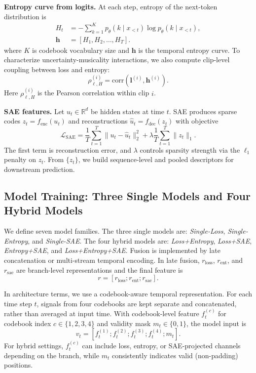 \documentclass{article}
\begin{document}
\textbf{Entropy curve from logits.}
At each step, entropy of the next-token distribution is
\begin{equation}
\begin{aligned}
H_t &= -\sum_{k=1}^{K}p_{\theta}(k\mid x_{<t})\log p_{\theta}(k\mid x_{<t}), \\
\mathbf{h} &= [H_1,H_2,\ldots,H_T].
\end{aligned}
\end{equation}
where $K$ is codebook vocabulary size
and $\mathbf{h}$ is the temporal entropy curve.
To characterize uncertainty-musicality interactions,
we also compute clip-level coupling between loss and entropy:
\begin{equation}
\rho_{\ell,H}^{(i)}=\mathrm{corr}(\mathbf{l}^{(i)},\mathbf{h}^{(i)}).
\end{equation}
Here $\rho_{\ell,H}^{(i)}$ is the Pearson correlation within clip $i$.

\textbf{SAE features.}
Let $u_t\in\mathbb{R}^{d}$ be hidden states at time $t$.
SAE produces sparse codes $z_t=f_{\mathrm{enc}}(u_t)$
and reconstructions $\hat{u}_t=f_{\mathrm{dec}}(z_t)$ with objective
\begin{equation}
\mathcal{L}_{\mathrm{SAE}}=
\frac{1}{T}\sum_{t=1}^{T}\|u_t-\hat{u}_t\|_2^2+
\lambda\frac{1}{T}\sum_{t=1}^{T}\|z_t\|_1.
\end{equation}
The first term is reconstruction error,
and $\lambda$ controls sparsity strength via the $\ell_1$ penalty on $z_t$.
From $\{z_t\}$, we build sequence-level and pooled descriptors for downstream prediction.

\subsection{Model Training: Three Single Models and Four Hybrid Models}

We define seven model families.
The three single models are:
\textit{Single-Loss}, \textit{Single-Entropy}, and \textit{Single-SAE}.
The four hybrid models are:
\textit{Loss+Entropy}, \textit{Loss+SAE}, \textit{Entropy+SAE}, and \textit{Loss+Entropy+SAE}.
Fusion is implemented by late concatenation or multi-stream temporal encoding.
In late fusion,
$r_{\text{loss}}$, $r_{\text{ent}}$, and $r_{\text{sae}}$ are branch-level representations
and the final feature is
\begin{equation}
r=[r_{\text{loss}};r_{\text{ent}};r_{\text{sae}}].
\end{equation}

In architecture terms, we use a codebook-aware temporal representation.
For each time step $t$, signals from four codebooks are kept separate and concatenated,
rather than averaged at input time.
With codebook-level feature $f_t^{(c)}$ for codebook index $c\in\{1,2,3,4\}$
and validity mask $m_t\in\{0,1\}$, the model input is
\begin{equation}
v_t=[f_t^{(1)};f_t^{(2)};f_t^{(3)};f_t^{(4)};m_t].
\end{equation}
For hybrid settings,
$f_t^{(c)}$ can include loss, entropy, or SAE-projected channels depending on the branch,
while $m_t$ consistently indicates valid (non-padding) positions.
\end{document}
